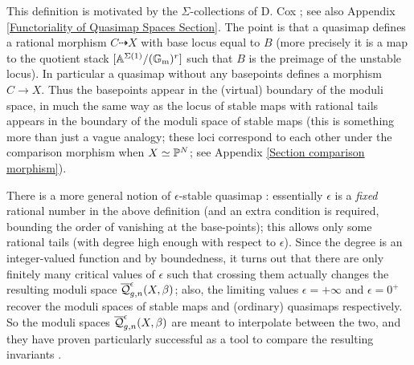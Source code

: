 \begin{remark} This definition is motivated by the $\Sigma$-collections of D. Cox \cite{CoxFunctor}; see also Appendix \ref{Functoriality of Quasimap Spaces Section}. The point is that a quasimap defines a rational morphism $C \dashrightarrow X$ with base locus equal to $B$ (more precisely it is a map to the quotient stack $[\mathbb{A}^{\Sigma(1)} / (\mathbb{G}_{\text{m}})^r]$ such that $B$ is the preimage of the unstable locus). In particular a quasimap without any basepoints defines a morphism $C \to X$. Thus the basepoints appear in the (virtual) boundary of the moduli space, in much the same way as the locus of stable maps with rational tails appears in the boundary of the moduli space of stable maps (this is something more than just a vague analogy; these loci correspond to each other under the comparison morphism when $X\simeq\mathbb P^N$; see Appendix \ref{Section comparison morphism}). \end{remark}

\begin{remark}
 There is a more general notion of $\epsilon$-stable quasimap \cite[\S 7.1]{CFKM}: essentially $\epsilon$ is a \emph{fixed} rational number in the above definition (and an extra condition is required, bounding the order of vanishing at the base-points); this allows only some rational tails (with degree high enough with respect to $\epsilon$). Since the degree is an integer-valued function and by boundedness, it turns out that there are only finitely many critical values of $\epsilon$ such that crossing them actually changes the resulting moduli space $\overline{\mathcal Q}^{\epsilon}_{g,n}(X,\beta)$; also, the limiting values $\epsilon=+\infty$ and $\epsilon=0^+$ recover the moduli spaces of stable maps and (ordinary) quasimaps respectively. So the moduli spaces $\overline{\mathcal Q}^{\epsilon}_{g,n}(X,\beta)$ are meant to interpolate between the two, and they have proven particularly successful as a tool to compare the resulting invariants \cite{CF-K-wallcrossing}.
\end{remark}

